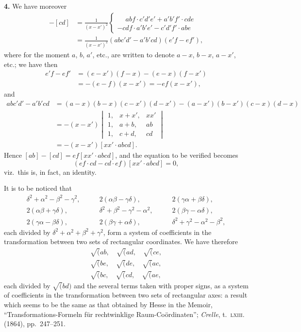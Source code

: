 \documentclass[11pt,a4paper]{book}
\begin{document}
\noindent\textbf{4.} We have moreover
\begin{align*}
[ab] - [cd] &= \frac{1}{(x - x')^2} \begin{cases}
\phantom{-}abf \cdot c'd'e' + a'b'f' \cdot cde \\
- cdf \cdot a'b'e' - c'd'f' \cdot abe
\end{cases} \\
&= \frac{1}{(x - x')^2}(abc'd' - a'b'cd)(e'f - ef'),
\end{align*}
where for the moment $a$, $b$, $a'$, etc., are written to denote $a - x$, $b - x$, $a - x'$, etc.; we have then
\begin{align*}
e'f - ef' &= (e - x')(f - x) - (e - x)(f - x') \\
&= -(e - f)(x - x') = -ef(x - x'),
\end{align*}
and
\begin{align*}
abc'd' - a'b'cd &= (a - x)(b - x)(c - x')(d - x') - (a - x')(b - x')(c - x)(d - x) \\
&= -(x - x') \begin{vmatrix} 1, & x + x', & xx' \\ 1, & a + b, & ab \\ 1, & c + d, & cd \end{vmatrix} \\
&= -(x - x')[xx' \cdot abcd].
\end{align*}
Hence $[ab] - [cd] = ef[xx' \cdot abcd]$, and the equation to be verified becomes
\[
(ef \cdot cd - cd \cdot ef)[xx' \cdot abcd] = 0,
\]
viz.~this is, in fact, an identity.

\smallskip

It is to be noticed that
\begin{align*}
\delta^2 + \alpha^2 - \beta^2 - \gamma^2, &\qquad 2(\alpha\beta - \gamma\delta), &\qquad 2(\gamma\alpha + \beta\delta), \\
2(\alpha\beta + \gamma\delta), &\qquad \delta^2 + \beta^2 - \gamma^2 - \alpha^2, &\qquad 2(\beta\gamma - \alpha\delta), \\
2(\gamma\alpha - \beta\delta), &\qquad 2(\beta\gamma + \alpha\delta), &\qquad \delta^2 + \gamma^2 - \alpha^2 - \beta^2,
\end{align*}
each divided by $\delta^2 + \alpha^2 + \beta^2 + \gamma^2$, form a system of coefficients in the transformation between two sets of rectangular coordinates. We have therefore
\begin{align*}
\surd(ab, \quad \surd(ad, \quad \surd(ce, \\
\surd(be, \quad \surd(de, \quad \surd(ac, \\
\surd(bc, \quad \surd(cd, \quad \surd(ae,
\end{align*}
each divided by $\surd(bd)$ and the several terms taken with proper signs, as a system of coefficients in the transformation between two sets of rectangular axes: a result which seems to be the same as that obtained by Hesse in the Memoir, ``Transformations-Formeln f\"ur rechtwinklige Raum-Co\"ordinaten''; \emph{Crelle}, t.~\textsc{lxiii}. (1864), pp.~247--251.
\end{document}
